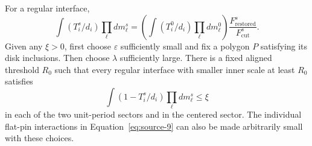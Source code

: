\begin{proposition}\label{kernels:average-loss}
For a regular interface,
\begin{equation}
 \int(T_i^s/d_i)\prod_\ell dm_\ell^s
 =
 \left(\int(T_i^0/d_i)\prod_\ell dm_\ell^0\right)
       \frac{F_{\mathrm{restored}}^s}{F_{\mathrm{cut}}^s}.
 \tag{10}\label{eq:source-10}
\end{equation}
Given any \(\xi>0\), first choose \(\varepsilon\) sufficiently small
and fix a polygon \(P\) satisfying its disk inclusions. Then choose
\(\lambda\) sufficiently large. There is a fixed aligned
threshold \(R_0\) such that every regular interface with smaller
inner scale at least \(R_0\) satisfies
\begin{equation}
             \int(1-T_i^s/d_i)\prod_\ell dm_\ell^s\le\xi
 \tag{11}\label{eq:source-11}
\end{equation}
in each of the two unit-period sectors and in the centered sector.
The individual flat-pin interactions in
Equation~\eqref{eq:source-9} can also be made arbitrarily small
with these choices.
\end{proposition}

